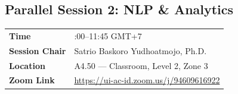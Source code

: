\documentclass[10pt,a4paper]{article}
\begin{document}
\clearpage
\subsection[Parallel Session 2: NLP \& Analytics]{\color{conf}Parallel Session 2: NLP \& Analytics}

\begin{tabularx}{\textwidth}{
    >{\raggedright\arraybackslash}p{3.4cm}
    >{\raggedright\arraybackslash}X
}
\rowcolor{lightgraybg}
\textbf{Time} & 10:00--11:45 GMT+7 \\

\rowcolor{lightgraybg}
\textbf{Session Chair} & Satrio Baskoro Yudhoatmojo, Ph.D. \\

\rowcolor{lightgraybg}
\textbf{Location} & A4.50 --- Classroom, Level 2, Zone 3\\

\rowcolor{lightgraybg}
\textbf{Zoom Link} & \href{https://ui-ac-id.zoom.us/j/94609616922?pwd=9ho2KPHiLRjN8HZ2MFqw9JrTkIkxt1.1}
{https://ui-ac-id.zoom.us/j/94609616922} \\
\end{tabularx}

\vspace{0.5em}

\small
\renewcommand{\arraystretch}{1.25}
\setlength{\tabcolsep}{5pt}
\end{document}

